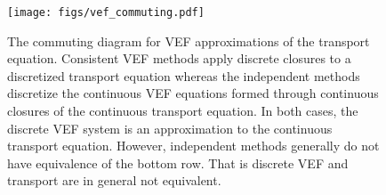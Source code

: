 \documentclass[../doc.tex]{subfiles}
\begin{document}
\begin{figure}
\centering
\texttt{[image: figs/vef\_commuting.pdf]}
\caption{The commuting diagram for VEF approximations of the transport equation. Consistent VEF methods apply discrete closures to a discretized transport equation whereas the independent methods discretize the continuous VEF equations formed through continuous closures of the continuous transport equation. In both cases, the discrete VEF system is an approximation to the continuous transport equation. However, independent methods generally do not have equivalence of the bottom row. That is discrete VEF and transport are in general not equivalent.}
\label{vef:commuting}
\end{figure}
\end{document}
